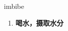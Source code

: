 
\begin{frame}
{\huge imbibe}
\begin{center}
\begin{enumerate}\Large
  \item \textbf{喝水，摄取水分}
\end{enumerate}
\end{center}
\end{frame}
